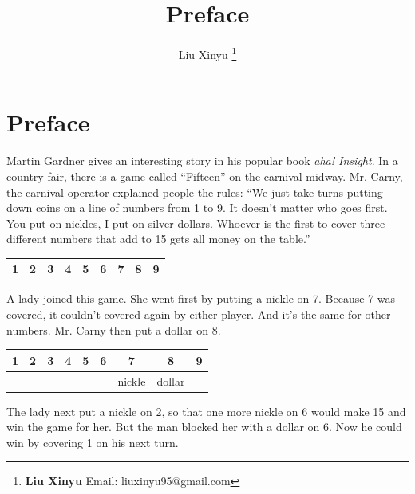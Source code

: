 \documentclass[UTF8]{article}
\begin{document}
\title{Preface}

\author{Liu Xinyu
\thanks{{\bfseries Liu Xinyu} \newline
  Email: liuxinyu95@gmail.com \newline}
  }

\maketitle
\fi


\chapter*{Preface}

Martin Gardner gives an interesting story in his popular book {\em aha! Insight}. In a country fair, there is a game called ``Fifteen'' on the carnival midway. Mr. Carny, the carnival operator explained people the rules: ``We just take turns putting down coins on a line of numbers from 1 to 9. It doesn't matter who goes first. You put on nickles, I put on silver dollars. Whoever is the first to cover three different numbers that add to 15 gets all money on the table.''

\vspace{5mm}
\begin{tabular}{|c|c|c|c|c|c|c|c|c|}
\hline
1 & 2 & 3 & 4 & 5 & 6 & 7 & 8 & 9 \\
\hline
\end{tabular}
\vspace{5mm}

A lady joined this game. She went first by putting a nickle on 7. Because 7 was covered, it couldn't covered again by either player. And it's the same for other numbers. Mr. Carny then put a dollar on 8.

\vspace{5mm}
\begin{tabular}{|c|c|c|c|c|c|c|c|c|}
\hline
1 & 2 & 3 & 4 & 5 & 6 & 7 & 8 & 9 \\
\hline
  &   &   &   &   &   & nickle & dollar & \\
\hline
\end{tabular}
\vspace{5mm}

The lady next put a nickle on 2, so that one more nickle on 6 would make 15 and win the game for her. But the man blocked her with a dollar on 6. Now he could win by covering 1 on his next turn.
\end{document}
